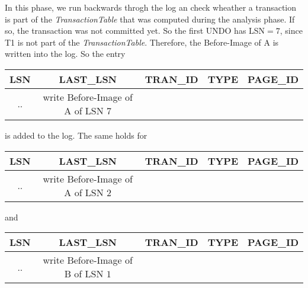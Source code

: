 \begin{exercise}{6}
  \begin{subexercise}
    In this phase, we run backwards throgh the log an check wheather a transaction is part of the \emph{TransactionTable} that was computed during the analysis phase. If so, the transaction was not committed yet. So the first UNDO has LSN$=7$, since T1 is not part of the \emph{TransactionTable}. Therefore, the Before-Image of A is written into the log. So the entry
    \\
    \begin{center}
      \begin{tabular}{ c | c | c | c | c }
        LSN & LAST\_LSN & TRAN\_ID & TYPE & PAGE\_ID \\ \hline
        ..  & write Before-Image of A of LSN $7$ & & & \\
      \end{tabular}
    \end{center}
    is added to the log. The same holds for 
    \begin{center}
      \begin{tabular}{ c | c | c | c | c }
        LSN & LAST\_LSN & TRAN\_ID & TYPE & PAGE\_ID \\ \hline
        ..  & write Before-Image of A of LSN $2$ & & & \\
      \end{tabular}
    \end{center}
    and 
    \begin{center}
      \begin{tabular}{ c | c | c | c | c }
        LSN & LAST\_LSN & TRAN\_ID & TYPE & PAGE\_ID \\ \hline
        ..  & write Before-Image of B of LSN $1$ & & & \\
      \end{tabular}
    \end{center}
  \end{subexercise}
\end{exercise}
